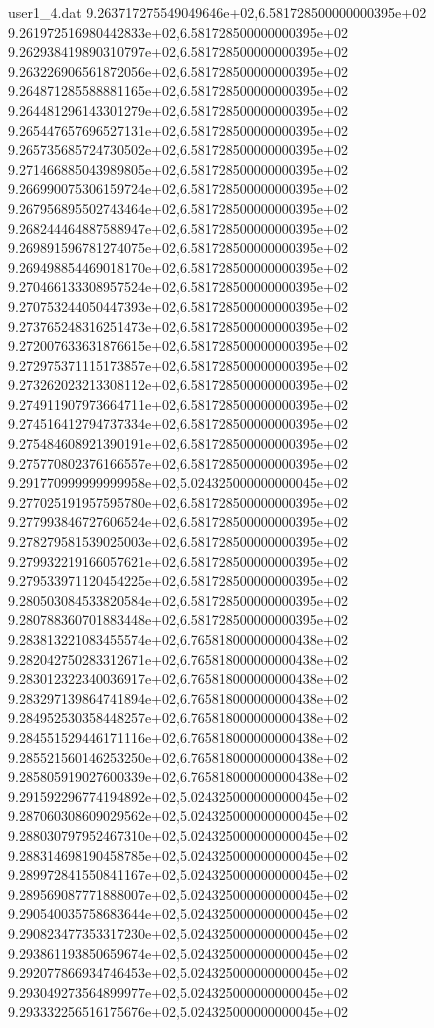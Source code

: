 \begin{filecontents}{user1_4.dat}
9.263717275549049646e+02,6.581728500000000395e+02
9.261972516980442833e+02,6.581728500000000395e+02
9.262938419890310797e+02,6.581728500000000395e+02
9.263226906561872056e+02,6.581728500000000395e+02
9.264871285588881165e+02,6.581728500000000395e+02
9.264481296143301279e+02,6.581728500000000395e+02
9.265447657696527131e+02,6.581728500000000395e+02
9.265735685724730502e+02,6.581728500000000395e+02
9.271466885043989805e+02,6.581728500000000395e+02
9.266990075306159724e+02,6.581728500000000395e+02
9.267956895502743464e+02,6.581728500000000395e+02
9.268244464887588947e+02,6.581728500000000395e+02
9.269891596781274075e+02,6.581728500000000395e+02
9.269498854469018170e+02,6.581728500000000395e+02
9.270466133308957524e+02,6.581728500000000395e+02
9.270753244050447393e+02,6.581728500000000395e+02
9.273765248316251473e+02,6.581728500000000395e+02
9.272007633631876615e+02,6.581728500000000395e+02
9.272975371115173857e+02,6.581728500000000395e+02
9.273262023213308112e+02,6.581728500000000395e+02
9.274911907973664711e+02,6.581728500000000395e+02
9.274516412794737334e+02,6.581728500000000395e+02
9.275484608921390191e+02,6.581728500000000395e+02
9.275770802376166557e+02,6.581728500000000395e+02
9.291770999999999958e+02,5.024325000000000045e+02
9.277025191957595780e+02,6.581728500000000395e+02
9.277993846727606524e+02,6.581728500000000395e+02
9.278279581539025003e+02,6.581728500000000395e+02
9.279932219166057621e+02,6.581728500000000395e+02
9.279533971120454225e+02,6.581728500000000395e+02
9.280503084533820584e+02,6.581728500000000395e+02
9.280788360701883448e+02,6.581728500000000395e+02
9.283813221083455574e+02,6.765818000000000438e+02
9.282042750283312671e+02,6.765818000000000438e+02
9.283012322340036917e+02,6.765818000000000438e+02
9.283297139864741894e+02,6.765818000000000438e+02
9.284952530358448257e+02,6.765818000000000438e+02
9.284551529446171116e+02,6.765818000000000438e+02
9.285521560146253250e+02,6.765818000000000438e+02
9.285805919027600339e+02,6.765818000000000438e+02
9.291592296774194892e+02,5.024325000000000045e+02
9.287060308609029562e+02,5.024325000000000045e+02
9.288030797952467310e+02,5.024325000000000045e+02
9.288314698190458785e+02,5.024325000000000045e+02
9.289972841550841167e+02,5.024325000000000045e+02
9.289569087771888007e+02,5.024325000000000045e+02
9.290540035758683644e+02,5.024325000000000045e+02
9.290823477353317230e+02,5.024325000000000045e+02
9.293861193850659674e+02,5.024325000000000045e+02
9.292077866934746453e+02,5.024325000000000045e+02
9.293049273564899977e+02,5.024325000000000045e+02
9.293332256516175676e+02,5.024325000000000045e+02

\end{filecontents}
